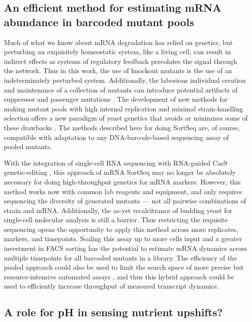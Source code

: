 \subsection{An efficient method for estimating mRNA abundance in
barcoded mutant pools}

Much of what we know about mRNA degradation has relied on genetics,
but perturbing an exquisitely homeostatic system, like a living cell, 
can result in indirect effects as systems of regulatory feedback 
percolates the signal through the network. 
Thus in this work, the use of knockout mutants is the use of
an indeterminately perturbed system. 
Additionally, the laborious individual creation and maintenance of a 
collection of mutants can introduce potential artifacts of suppressor 
and passenger mutations \parencite{kwan2016rdna,markowitz2017reduced}.
The development of new methods for making mutant pools with 
high internal replication and minimal strain-handling selection
offers a new paradigm of yeast genetics that avoids or
minimizes some of these drawbacks \parencite{smith2016quantitative}.
The methods described here for doing SortSeq are, of course,
compatible with adaptation to any DNA-barcode-based sequencing assay 
of pooled mutants. 

With the integration of single-cell RNA sequencing with 
RNA-guided Cas9 genetic-editing 
\parencite{dixit2016perturb,hill2018design},
this approach of mRNA SortSeq may no longer be absolutely
necessary for doing high-throughput genetics for mRNA markers. 
However, this method works now with common lab reagents and equipment, 
and only requires sequencing the diversity of generated mutants ---
not all pairwise combinations of strain and mRNA.
Additionally, the as-yet recalcitrance of budding yeast for 
single-cell molecular analysis is still a barrier.
Thus restricting the requisite sequencing opens the opportunity to
apply this method across more replicates, markers, and timepoints.
Scaling this assay up to more cells input and a greater investment
in FACS sorting \parencite{de2017deciphering} has the potential to 
estimate mRNA dynamics across multiple
timepoints for all barcoded mutants in a library.
The efficiency of the pooled approach could also be used to limit the
search space of more precise but resource-intensive automated assays
\parencite{worley2016genome}, 
and thus this hybrid approach could be used to
efficiently increase throughput of measured transcript dynamics. 

\iffalse

\subsection{A role for pH in sensing nutrient upshifts?}

